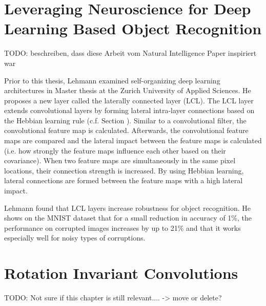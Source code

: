 \section{Leveraging Neuroscience for Deep Learning Based Object Recognition}
TODO: beschreiben, dass diese Arbeit vom Natural Intelligence Paper inspiriert war

Prior to this thesis, Lehmann  examined self-organizing deep learning architectures in Master thesis at the Zurich University of Applied Sciences.
He proposes a new layer called the laterally connected layer (LCL).
The LCL layer extends convolutional layers by forming lateral intra-layer connections based on the Hebbian learning rule (c.f. Section ).
Similar to a convolutional filter, the convolutional feature map is calculated.
Afterwards, the convolutional feature maps are compared and the lateral impact between the feature maps is calculated (i.e. how strongly the feature maps influence each other based on their covariance).
When two feature maps are simultaneously in the same pixel locations, their connection strength is increased.
By using Hebbian learning, lateral connections are formed between the feature maps with a high lateral impact.

Lehmann found that LCL layers increase robustness for object recognition.
He shows on the MNIST dataset that for a small reduction in accuracy of 1\%, the performance on corrupted images increases by up to 21\% and that it works especially well for noisy types of corruptions.

\section{Rotation Invariant Convolutions}

TODO: Not sure if this chapter is still relevant.... -> move or delete?

